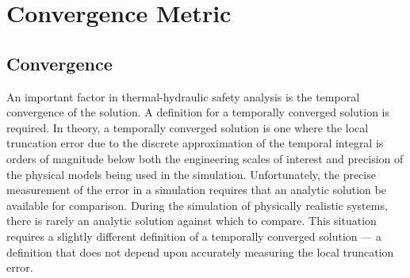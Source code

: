 \chapter{Convergence Metric}
\label{chap:convergence_metric}

\section{Convergence}
\label{sect:temporal_convergence}

An important factor in thermal-hydraulic safety analysis is the temporal convergence of the solution.
A definition for a temporally converged solution is required.
In theory, a temporally converged solution is one where the local truncation error due to the discrete approximation of the temporal integral is orders of magnitude below both the engineering scales of interest and precision of the physical models being used in the simulation.
Unfortunately, the precise measurement of the error in a simulation requires that an analytic solution be available for comparison.
During the simulation of physically realistic systems, there is rarely an analytic solution against which to compare.
This situation requires a slightly different definition of a temporally converged solution --- a definition that does not depend upon accurately measuring the local truncation error.

